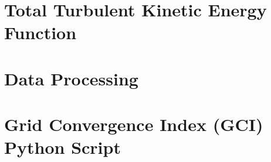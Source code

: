\documentclass[a4paper,12pt]{report}
\begin{document}
\maketitle
\newpage









\tableofcontents
\listoffigures
\listoftables








\printbibliography[heading=bibintoc, title={References}]

\begin{appendices}
\chapter{Total Turbulent Kinetic Energy Function}
\label{chap:appendixA}


\chapter{Data Processing}
\label{chap:appendixB}


\chapter{Grid Convergence Index (GCI) Python Script}
\label{chap:appendixC}


\end{appendices}
\end{document}
